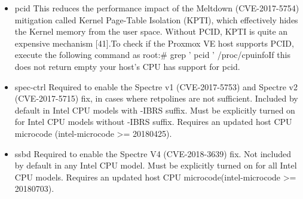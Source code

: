 \begin{itemize}[leftmargin=2cm]

	\item pcid This reduces the performance impact of the Meltdown (CVE-2017-5754) mitigation called Kernel Page-Table Isolation (KPTI), which effectively hides the Kernel memory from the user space. Without PCID, KPTI is quite an expensive mechanism [41].To check if the Proxmox VE host supports PCID, execute the following command as root:# grep ' pcid ' /proc/cpuinfoIf this does not return empty your host’s CPU has support for pcid.

	\item spec-ctrl Required to enable the Spectre v1 (CVE-2017-5753) and Spectre v2 (CVE-2017-5715) fix, in cases where retpolines are not sufficient. Included by default in Intel CPU models with -IBRS suffix. Must be explicitly turned on for Intel CPU models without -IBRS suffix. Requires an updated host CPU microcode (intel-microcode >= 20180425).

	\item ssbd Required to enable the Spectre V4 (CVE-2018-3639) fix. Not included by default in any Intel CPU model. Must be explicitly turned on for all Intel CPU models. Requires an updated host CPU microcode(intel-microcode >= 20180703).

\end{itemize}

